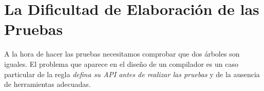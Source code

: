 %
%
%
%
%

\section{La Dificultad de Elaboración de las Pruebas}

A la hora de hacer las pruebas necesitamos comprobar que dos árboles
son iguales. El problema que aparece en el diseño de un compilador 
es un caso particular de la regla
\emph{defina su API antes de realizar las pruebas} y de la ausencia de herramientas
adecuadas.

